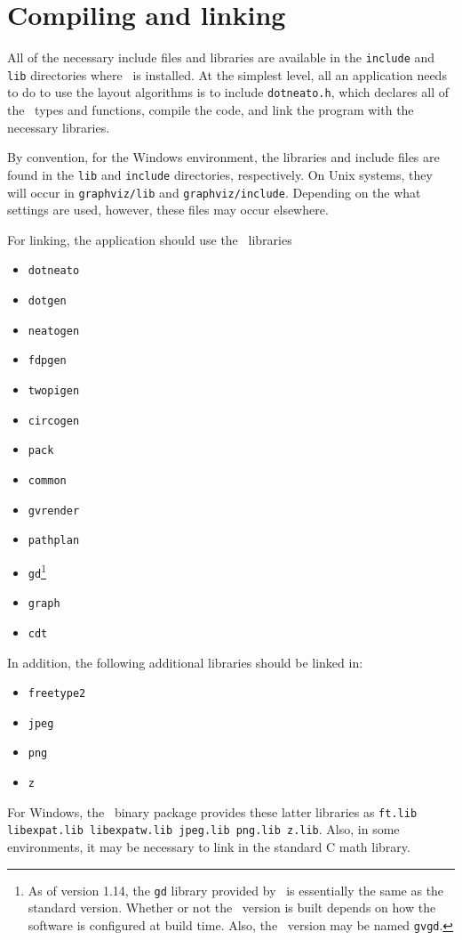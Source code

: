 \section{Compiling and linking}
\label{sec:build}
All of the necessary include files and libraries are available
in the {\tt include} and {\tt lib} directories where \gviz\
is installed. At the simplest level, all an application needs
to do to use the layout algorithms is to include {\tt dotneato.h},
which declares all of the \gviz\ types and functions,
compile the code,
and link the program with the necessary libraries.

By convention, for the Windows environment, the libraries and include files
are found in the {\tt lib} and {\tt include} directories,
respectively. On Unix systems, they will occur in  {\tt graphviz/lib} 
and {\tt graphviz/include}. Depending on the what settings are used,
however, these files may occur elsewhere.

For linking, the application should use the \gviz\ libraries 
\begin{itemize}
\item {\tt dotneato}
\item {\tt dotgen}
\item {\tt neatogen}
\item {\tt fdpgen}
\item {\tt twopigen}
\item {\tt circogen}
\item {\tt pack}
\item {\tt common}
\item {\tt gvrender}
\item {\tt pathplan}
\item {\tt gd}\footnote{
As of version 1.14, the {\tt gd} library provided by \gviz\ is essentially
the same as the standard version. Whether or not the \gviz\ version is built
depends on how the software is configured at build time. Also, the \gviz\
version may be named {\tt gvgd}.
}
\item {\tt graph}
\item {\tt cdt}
\end{itemize}
In addition, the following additional libraries should be linked in:
\begin{itemize}
\item {\tt freetype2}
\item {\tt jpeg}
\item {\tt png}
\item {\tt z}
\end{itemize}
For Windows, the \gviz\ binary package provides these latter libraries as
{\tt ft.lib libexpat.lib libexpatw.lib jpeg.lib png.lib z.lib}.
Also, in some environments, it may be necessary to link
in the standard C math library.

